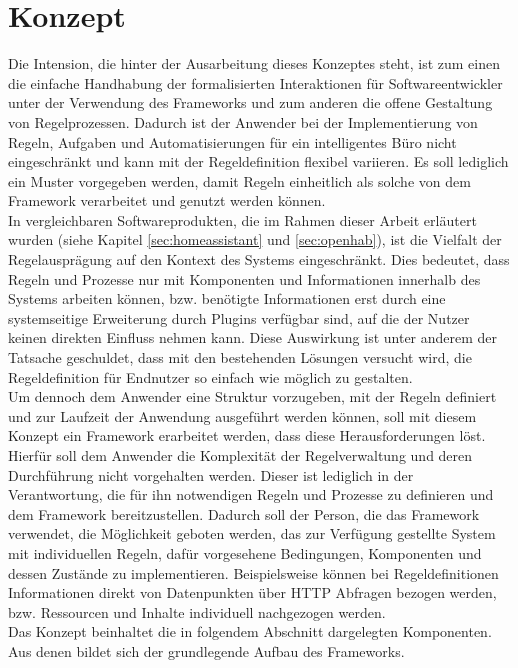 \section{Konzept}
\label{sec:concept}
    Die Intension, die hinter der Ausarbeitung dieses Konzeptes steht, ist zum einen die einfache Handhabung der 
    formalisierten Interaktionen für Softwareentwickler %
    unter der Verwendung des Frameworks und zum anderen die 
    offene Gestaltung von Regelprozessen. Dadurch ist der Anwender bei der Implementierung von Regeln, Aufgaben und Automatisierungen 
    für ein intelligentes Büro nicht eingeschränkt und kann mit der Regeldefinition flexibel variieren.
    Es soll lediglich ein Muster vorgegeben werden, damit Regeln einheitlich als solche von dem Framework 
    verarbeitet und genutzt werden können. 
    \\ 
    \linebreak
    In vergleichbaren Softwareprodukten, die im Rahmen dieser Arbeit erläutert 
    wurden (siehe Kapitel \ref{sec:homeassistant} und \ref{sec:openhab}), ist die Vielfalt der Regelausprägung auf 
    den Kontext des Systems eingeschränkt. Dies bedeutet, dass 
    Regeln und Prozesse nur mit Komponenten und Informationen innerhalb des Systems arbeiten können, bzw. benötigte 
    Informationen erst durch eine systemseitige Erweiterung durch Plugins verfügbar sind, auf die der Nutzer keinen direkten 
    Einfluss nehmen kann. Diese Auswirkung ist unter anderem der 
    Tatsache geschuldet, dass mit den bestehenden Lösungen versucht wird, die Regeldefinition für Endnutzer so 
    einfach wie möglich zu gestalten. 
    \\
    \linebreak
    Um dennoch dem Anwender eine Struktur vorzugeben, mit der Regeln definiert und zur Laufzeit der Anwendung ausgeführt 
    werden können, soll mit diesem Konzept ein Framework erarbeitet werden, dass diese Herausforderungen löst. Hierfür soll 
    dem Anwender die Komplexität der Regelverwaltung und deren Durchführung nicht vorgehalten werden. Dieser ist lediglich 
    in der Verantwortung, die für ihn notwendigen Regeln und Prozesse zu definieren und dem Framework bereitzustellen. 
    Dadurch soll der Person, die das Framework verwendet, die Möglichkeit geboten werden, das zur Verfügung gestellte System 
    mit individuellen Regeln, dafür vorgesehene Bedingungen, Komponenten und dessen Zustände zu implementieren. Beispielsweise 
    können bei Regeldefinitionen Informationen direkt von Datenpunkten über \acs{HTTP} Abfragen bezogen werden, bzw. Ressourcen 
    und Inhalte individuell nachgezogen werden.
    \\ 
    Das Konzept beinhaltet die in folgendem Abschnitt dargelegten Komponenten. Aus denen bildet sich der grundlegende Aufbau 
    des Frameworks.

